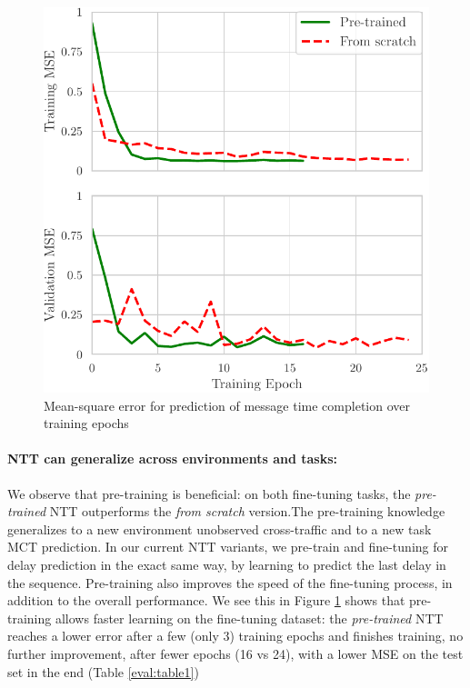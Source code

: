 \begin{figure}[!h]
  \begin{center}
    \includegraphics[scale=1]{figures/MCT_loss.pdf}
    \caption{Mean-square error for prediction of message
time completion over training epochs}
    \label{fig:loss_mct}
  \end{center}
\end{figure}

\vspace{-1cm}

\paragraph*{NTT can generalize across environments and tasks:}

We observe that pre-training is beneficial: on both fine-tuning tasks, the \emph{pre-trained} NTT outperforms the \emph{from scratch} version.The pre-training knowledge generalizes to a new environment \ie unobserved cross-traffic and to a new task \ie MCT prediction. In our current NTT variants, we pre-train and fine-tuning for delay prediction in the exact same way, by learning to predict the last delay in the sequence. Pre-training also improves the speed of the fine-tuning process, in addition to the overall performance. We see this in Figure \ref{fig:loss_mct} shows that pre-training allows faster learning on the fine-tuning dataset: the \emph{pre-trained} NTT reaches a lower error after a few (only 3) training epochs and finishes training, \ie no further improvement, after fewer epochs (16 vs 24), with a lower MSE on the test set in the end (Table \ref{eval:table1})


